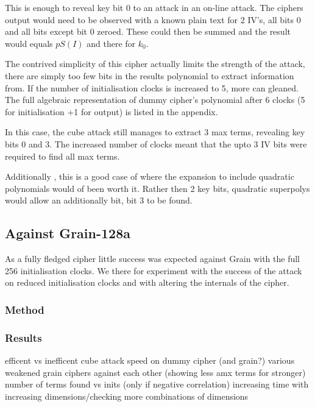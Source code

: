 \documentclass{report}
\let\Oldsubsection\subsection
\renewcommand{\subsection}{\FloatBarrier\Oldsubsection}
\let\Oldsubsubsection\subsubsection
\renewcommand{\subsubsection}{\FloatBarrier\Oldsubsubsection}
\begin{document}
This is enough to reveal key bit 0 to an attack in an on-line attack. The ciphers output would need to be observed with a known plain text for 2 IV's, all bits 0 and all bits except bit 0 zeroed. These could then be summed and the result would equals $pS(I)$ and there for $k_0$.

The contrived simplicity of this cipher actually limits the strength of the attack, there are simply too few bits in the results polynomial to extract information from. If the number of initialisation clocks is increased to 5, more can gleaned. The full algebraic representation of dummy cipher's polynomial after 6 clocks (5 for initialisation +1 for output) is listed in the appendix.

In this case, the cube attack still manages to extract 3 max terms, revealing key bits 0 and 3. The increased number of clocks meant that the upto 3 IV bits were required to find all max terms.

Additionally , this is a good case of where the expansion to include quadratic polynomials would of been worth it. Rather then 2 key bits, quadratic superpolys would allow an additionally bit, bit 3 to be found.
\subsection{Against Grain-128a}
As a fully fledged cipher little success was expected against Grain with the full 256 initialisation clocks. We there for experiment with the success of the attack on reduced initialisation clocks and with altering the internals of the cipher.
\subsubsection{Method}
\subsubsection{Results}
efficent vs inefficent cube attack speed on dummy cipher
(and grain?)
various weakened grain ciphers against each other (showing less amx terms for stronger)
number of terms found vs inits (only if negative correlation)
increasing time with increasing dimensions/checking more combinations of dimensions
\end{document}
